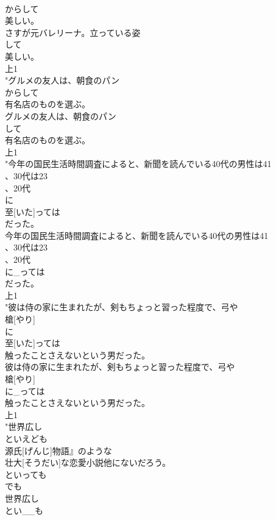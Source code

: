 \documentclass[8pt]{extreport}
\begin{document}
\begin{CJK}{UTF8}{min}
\\	からして
\\	美しい。
\\	さすが元バレリーナ。立っている姿
\\	して
\\	美しい。
\\	上1
\\	"グルメの友人は、朝食のパン
\\	からして
\\	有名店のものを選ぶ。
\\	グルメの友人は、朝食のパン
\\	して
\\	有名店のものを選ぶ。
\\	上1
\\	"今年の国民生活時間調査によると、新聞を読んでいる40代の男性は41
\\	、30代は23
\\	、20代
\\	に
\\	至[いた]っては
\\	だった。
\\	今年の国民生活時間調査によると、新聞を読んでいる40代の男性は41
\\	、30代は23
\\	、20代
\\	に_っては
\\	だった。
\\	上1
\\	"彼は侍の家に生まれたが、剣もちょっと習った程度で、弓や
\\	槍[やり]
\\	に
\\	至[いた]っては
\\	触ったことさえないという男だった。
\\	彼は侍の家に生まれたが、剣もちょっと習った程度で、弓や
\\	槍[やり]
\\	に_っては
\\	触ったことさえないという男だった。
\\	上1
\\	"世界広し
\\	といえども
\\	源氏[げんじ]物語』のような
\\	壮大[そうだい]な恋愛小説他にないだろう。
\\	といっても 
\\	でも	
\\	世界広し
\\	とい__も

\end{CJK}
\end{document}
